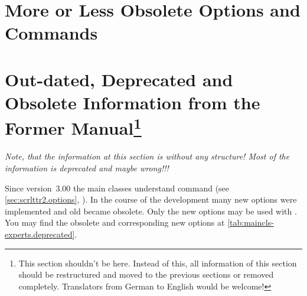 \section{More or Less Obsolete Options and Commands}
\label{sec:maincls-experts.obsolete}



\section{Out-dated, Deprecated and Obsolete Information from the Former
  \KOMAScript{} Manual\protect\footnote{This section shouldn't be here. Instead of this, all information of this
  section should be restructured and moved to the previous sections or removed
  completely. Translators from German to English would be welcome!}}
\label{sec:maincls-experts.deprecated}

\emph{Note, that the information at this section is without any structure!
  Most of the information is deprecated and maybe wrong!!!}

Since version~3.00 the main classes understand command 
(see \autoref{sec:scrlttr2.options},
).  In the course of the
development many new options were implemented and old became obsolete.  Only
the new options may be used with .  You may find the
obsolete and corresponding new options at
\autoref{tab:maincls-experts.deprecated}.

